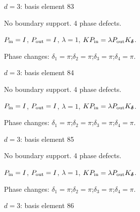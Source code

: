 {\Large $d=3$: basis element 83}\par
No boundary support. 4 phase defects.
\begin{center}
\end{center}
\vspace{-1mm}
$P_{\rm in}=I$, \quad $P_{\rm out}=I$, \quad $\lambda=1$, \qquad $K P_{\rm in}=\lambda P_{\rm out}K_{\boldsymbol\delta}$.
\par\smallskip\begin{minipage}{.98\linewidth}\small Phase changes: $\delta_{1}=\pi$;\quad $\delta_{2}=\pi$;\quad $\delta_{3}=\pi$;\quad $\delta_{4}=\pi$.\end{minipage}
\vfill
{\footnotesize\texttt{}}
\newpage
{}
{\Large $d=3$: basis element 84}\par
No boundary support. 4 phase defects.
\begin{center}
\end{center}
\vspace{-1mm}
$P_{\rm in}=I$, \quad $P_{\rm out}=I$, \quad $\lambda=1$, \qquad $K P_{\rm in}=\lambda P_{\rm out}K_{\boldsymbol\delta}$.
\par\smallskip\begin{minipage}{.98\linewidth}\small Phase changes: $\delta_{1}=\pi$;\quad $\delta_{2}=\pi$;\quad $\delta_{3}=\pi$;\quad $\delta_{4}=\pi$.\end{minipage}
\vfill
{\footnotesize\texttt{}}
\newpage
{}
{\Large $d=3$: basis element 85}\par
No boundary support. 4 phase defects.
\begin{center}
\end{center}
\vspace{-1mm}
$P_{\rm in}=I$, \quad $P_{\rm out}=I$, \quad $\lambda=1$, \qquad $K P_{\rm in}=\lambda P_{\rm out}K_{\boldsymbol\delta}$.
\par\smallskip\begin{minipage}{.98\linewidth}\small Phase changes: $\delta_{1}=\pi$;\quad $\delta_{2}=\pi$;\quad $\delta_{3}=\pi$;\quad $\delta_{4}=\pi$.\end{minipage}
\vfill
{\footnotesize\texttt{}}
\newpage
{}
{\Large $d=3$: basis element 86}\par
